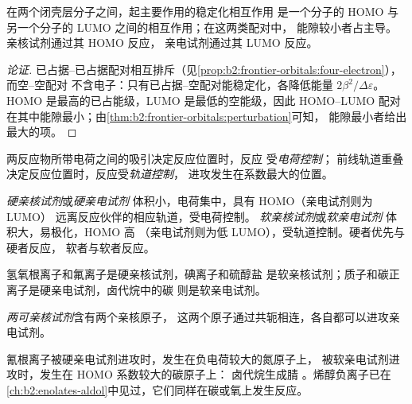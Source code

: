 \begin{proposition}[主导相互作用]\label{prop:b2:frontier-orbitals:dominant}
在两个闭壳层分子之间，起主要作用的稳定化相互作用
是一个分子的 HOMO 与另一个分子的 LUMO 之间的相互作用；在这两类配对中，
能隙较小者占主导。亲核试剂通过其 HOMO 反应，
亲电试剂通过其 LUMO 反应。
\end{proposition}

\begin{proof}[论证]
已占据–已占据配对相互排斥（见\cref{prop:b2:frontier-orbitals:four-electron}），而空–空配对
不含电子：只有已占据–空配对能稳定化，各降低能量 $2\beta^2/\Delta\varepsilon$。
HOMO 是最高的已占能级，LUMO 是最低的空能级，因此
HOMO–LUMO 配对在其中能隙最小；由\cref{thm:b2:frontier-orbitals:perturbation}可知，
能隙最小者给出最大的项。
\end{proof}

\begin{definition}[电荷控制与轨道控制]\label{def:b2:frontier-orbitals:control}
两反应物所带电荷之间的吸引决定反应位置时，反应
受\emph{电荷控制}；
前线轨道重叠决定反应位置时，反应受\emph{轨道控制}，
进攻发生在系数最大的位置。
\end{definition}

\begin{definition}[硬物种与软物种]\label{def:b2:frontier-orbitals:hard-soft}
\emph{硬亲核试剂}或\emph{硬亲电试剂}
体积小，电荷集中，具有 HOMO（亲电试剂则为 LUMO）
远离反应伙伴的相应轨道，受电荷控制。
\emph{软亲核试剂}或\emph{软亲电试剂}
体积大，易极化，HOMO 高
（亲电试剂则为低 LUMO），受轨道控制。硬者优先与硬者反应，
软者与软者反应。
\end{definition}

氢氧根离子和氟离子是硬亲核试剂，碘离子和硫醇盐
是软亲核试剂；质子和碳正离子是硬亲电试剂，卤代烷中的碳
则是软亲电试剂。

\begin{definition}[两可亲核试剂]\label{def:b2:frontier-orbitals:ambident}
\emph{两可亲核试剂}含有两个亲核原子，
这两个原子通过共轭相连，各自都可以进攻亲电试剂。
\end{definition}

氰根离子被硬亲电试剂进攻时，发生在负电荷较大的氮原子上，
被软亲电试剂进攻时，发生在 HOMO 系数较大的碳原子上：
卤代烷生成腈 。烯醇负离子已在
\cref{ch:b2:enolates-aldol}中见过，它们同样在碳或氧上发生反应。

